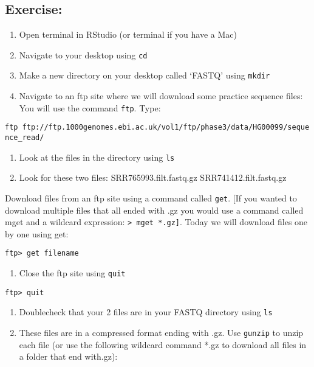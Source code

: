 \documentclass[]{article}
\providecommand{\tightlist}{%
  \setlength{\itemsep}{0pt}\setlength{\parskip}{0pt}}
\begin{document}
\subsection{Exercise:}\label{exercise}

\begin{enumerate}
\def\labelenumi{\arabic{enumi}.}
\item
  Open terminal in RStudio (or terminal if you have a Mac)
\item
  Navigate to your desktop using \texttt{cd}
\item
  Make a new directory on your desktop called `FASTQ' using
  \texttt{mkdir}
\item
  Navigate to an ftp site where we will download some practice sequence
  files: You will use the command \texttt{ftp}. Type:
\end{enumerate}

\texttt{ftp\ ftp://ftp.1000genomes.ebi.ac.uk/vol1/ftp/phase3/data/HG00099/sequence\_read/}

\begin{enumerate}
\def\labelenumi{\arabic{enumi}.}
\setcounter{enumi}{4}
\item
  Look at the files in the directory using \texttt{ls}
\item
  Look for these two files: SRR765993.filt.fastq.gz
  SRR741412.filt.fastq.gz
\end{enumerate}

Download files from an ftp site using a command called \texttt{get}.
{[}If you wanted to download multiple files that all ended with .gz you
would use a command called mget and a wildcard expression:
\texttt{\textgreater{}\ mget\ *.gz{]}}. Today we will download files one
by one using get:

\texttt{ftp\textgreater{}\ get\ \textquotesingle{}filename\textquotesingle{}}

\begin{enumerate}
\def\labelenumi{\arabic{enumi}.}
\setcounter{enumi}{6}
\tightlist
\item
  Close the ftp site using \texttt{quit}
\end{enumerate}

\texttt{ftp\textgreater{}\ quit}

\begin{enumerate}
\def\labelenumi{\arabic{enumi}.}
\setcounter{enumi}{7}
\item
  Doublecheck that your 2 files are in your FASTQ directory using
  \texttt{ls}
\item
  These files are in a compressed format ending with .gz. Use
  \texttt{gunzip} to unzip each file (or use the following wildcard
  command *.gz to download all files in a folder that end with.gz):
\end{enumerate}
\end{document}
